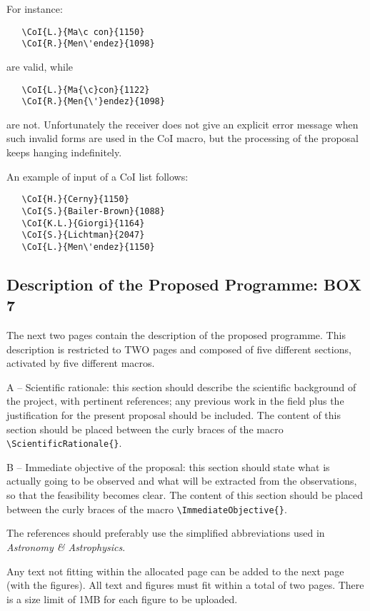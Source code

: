 \documentclass{article}
\begin{document}
\noindent
For instance:
\begin{verbatim}
   \CoI{L.}{Ma\c con}{1150}
   \CoI{R.}{Men\'endez}{1098}
\end{verbatim}

\noindent
are valid, while

\begin{verbatim}
   \CoI{L.}{Ma{\c}con}{1122}
   \CoI{R.}{Men{\'}endez}{1098}
\end{verbatim}

\noindent
are not. Unfortunately the receiver does not give an
explicit error message when such invalid forms are
used in the CoI macro, but the processing of the proposal
keeps hanging indefinitely.

\vspace{0.5cm}
An example of input of a
CoI list follows:
\begin{verbatim}
   \CoI{H.}{Cerny}{1150}
   \CoI{S.}{Bailer-Brown}{1088}
   \CoI{K.L.}{Giorgi}{1164}
   \CoI{S.}{Lichtman}{2047}
   \CoI{L.}{Men\'endez}{1150}
\end{verbatim}

\subsection{Description of the Proposed Programme: {\bf BOX 7}}

The next two pages contain the description of the proposed programme.
This description is restricted to TWO pages and composed of five
different sections, activated by five different macros.

A -- Scientific rationale: this section should describe the scientific
background of the project, with pertinent references; any previous
work in the field plus the justification for the present proposal
should be included.  The content of this section should be placed
between the curly braces of the macro \verb|\ScientificRationale{}|. 

B -- Immediate objective of the proposal: this section should state what
is actually going to be observed and what will be extracted from the
observations, so that the feasibility becomes clear.  The content of
this section should be placed between the curly braces of the
macro \verb|\ImmediateObjective{}|.

The references should preferably use the simplified abbreviations used
in {\em Astronomy \& Astrophysics\/}.

\medskip

 Any text not fitting within the allocated page can be
added to the next page (with the figures). All text and figures must
fit within a total of two pages.
There is a size limit of 1MB for each figure to be uploaded.
\end{document}
